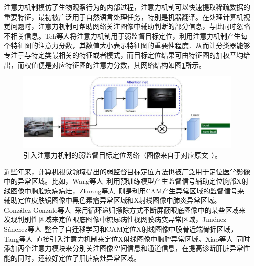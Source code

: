 注意力机制模仿了生物观察行为的内部过程，注意力机制可以快速提取稀疏数据的重要特征，最初被广泛用于自然语言处理任务，特别是机器翻译。在处理计算机视觉问题时，注意力机制可帮助网络关注图像中辅助判断的部分信息，与此同时忽略不相关信息。Teh等人\cite{BMVC2016_52}将注意力机制用于弱监督目标定位，利用注意力机制产生每个特征图的注意力分数，其数值大小表示特征图的重要性程度，从而让分类器能够专注于与特定类最相关的特征或者模式，而目标定位结果可由特征图的加权平均给出，而权值便是对应特征图的注意力分数，其网络结构如图\ref{fig:attention_weakly_supervised_object_localization}所示。
\begin{figure}[h]
	\centering
	\includegraphics[width=1.0\textwidth]{figure/attention_weakly_supervised_object_localization}
	\caption[引入注意力机制的弱监督目标定位网络]{引入注意力机制的弱监督目标定位网络（图像来自于对应原文~\cite{BMVC2016_52}）。}
	\label{fig:attention_weakly_supervised_object_localization}
\end{figure}

近些年来，计算机视觉领域提出的弱监督目标定位方法也被广泛用于定位医学影像中的异常区域。比如，Wang等人~\cite{WangPLLBS17}利用预训练模型产生监督信号辅助定位胸部X射线图像中胸腔疾病病灶，Zhuang等人~\cite{zhuang2019care}则是利用CAM产生异常区域的监督信号来辅助定位皮肤镜图像中黑色素瘤异常区域和X射线图像中肺炎异常区域。Gonz{\'a}lez-Gonzalo等人~\cite{GonzlezGonzalo2018ImprovingWL}采用循环递归擦除方式不断屏蔽眼底图像中的某些区域来发现判别性区域来定位眼底图像中糖尿病性视网膜病变异常区域，Jim{\'e}nez-S{\'a}nchez等人~\cite{JimnezSnchez2018WeaklySupervisedLA}整合了自迁移学习和CAM定位X射线图像中股骨近端骨折区域，Tang等人~\cite{Tang2018AttentionGuidedCL}直接引入注意力机制来定位X射线图像中胸腔异常区域。Xiao等人~\cite{chen2019cascade}同时添加两个注意力模块来分别关注图像空间信息和通道信息，在提高诊断肝脏异常性能的同时，还较好定位了肝脏病灶异常区域。

